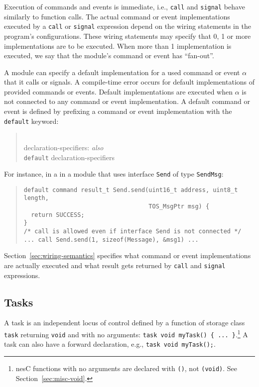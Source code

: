 \documentclass[11pt,letterpaper]{article}
\newcommand{\kw}[1]{{\tt #1}}
\newcommand{\code}[1]{{\tt #1}}
\newcommand{\nesc}{nesC\xspace}
\newcommand{\grammarshift}{\vspace*{-.7cm}}
\newcommand{\grammarindent}{\hspace*{2cm}\= \\ \kill}
\begin{document}
Execution of commands and events is immediate, i.e., \kw{call} and
\kw{signal} behave similarly to function calls. The actual command or event
implementations executed by a \code{call} or \code{signal} expression
depend on the wiring statements in the program's configurations. These
wiring statements may specify that 0, 1 or more implementations are to be
executed. When more than 1 implementation is executed, we say that the
module's command or event has ``fan-out''.  

A module can specify a default implementation for a used command or event
$\alpha$ that it calls or signals. A compile-time error occurs for default
implementations of provided commands or events. Default implementations are
executed when $\alpha$ is not connected to any command or event
implementation. A default command or event is defined by prefixing a
command or event implementation with the \kw{default} keyword:
\begin{quote} \grammarshift \em \begin{tabbing}
\grammarindent
declaration-specifiers: \emph{also}\\
\>	\kw{default} declaration-specifiers\\
\end{tabbing} \end{quote}
For instance, in a in a module that uses interface \code{Send} of type
\kw{SendMsg}:
\begin{quote} \begin{verbatim}
default command result_t Send.send(uint16_t address, uint8_t length, 
                                   TOS_MsgPtr msg) {
  return SUCCESS;
}
/* call is allowed even if interface Send is not connected */
... call Send.send(1, sizeof(Message), &msg1) ...
\end{verbatim} \end{quote}

Section~\ref{sec:wiring-semantics} specifies what command or event
implementations are actually executed and what result gets returned by
\code{call} and \code{signal} expressions.

\subsection{Tasks}

A task is an independent locus of control defined by a function of
storage class \kw{task} returning \kw{void} and with no arguments:
\code{task void myTask() \{ ... \}}.\footnote{\nesc functions with no
arguments are declared with \code{()}, not \code{(void)}. See
Section~\ref{sec:misc-void}.} A task can also have a forward declaration, e.g.,
\code{task void myTask();}.
\end{document}
